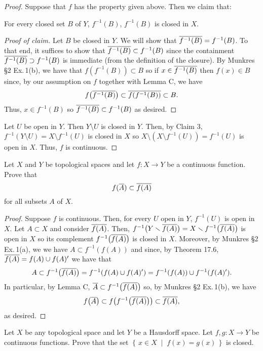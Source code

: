 \begin{proof}
Suppose that $f$ has the property given above. Then we claim that:
\begin{claim}
For every closed set $B$ of $Y$, $f^{-1}(B)$, $f^{-1}(B)$ is
closed in $X$.
\end{claim}
\begin{proof}[Proof of claim]
\renewcommand\qedsymbol{$\clubsuit$}
Let $B$ be closed in $Y$. We will show that
$\overline{f^{-1}(B)}=f^{-1}(B)$. To that end, it suffices to show
that $\overline{f^{-1}(B)}\subset f^{-1}(B)$ since the containment
$\overline{f^{-1}(B)}\supset f^{-1}(B)$ is immediate (from the
definition of the closure). By Munkres \S2 Ex.\,1(b), we have
that $f(f^{-1}(B))\subset B$ so if $x\in\overline{f^{-1}(B)}$ then
$f(x)\in B$ since, by our assumption on $f$ together with Lemma
C, we have
\[
f\bigl(\overline{f^{-1}(B)}\bigr)\subset\overline{f(f^{-1}(B))}\subset B.
\]
Thus, $x\in f^{-1}(B)$ so $\overline{f^{-1}(B)}\subset f^{-1}(B)$ as
desired.
\end{proof}
Let $U$ be open in $Y$. Then $Y\setminus U$ is closed in
$Y$. Then, by Claim 3, $f^{-1}(Y\setminus U)=X\setminus
f^{-1}(U)$ is closed in $X$ so $X\setminus (X\setminus
f^{-1}(U))=f^{-1}(U)$ is open in $X$. Thus, $f$ is continuous.
\end{proof}
\begin{problem}
Let $X$ and $Y$ be topological spaces and let $f\colon X\to Y$ be
a continuous function. Prove that
\[
f(\overline{A})\subset\overline{f(A)}
\]
for all subsets $A$ of $X$.
\end{problem}
\begin{proof}
Suppose $f$ is continuous. Then, for every $U$ open in $Y$,
$f^{-1}(U)$ is open in $X$. Let $A\subset X$ and consider
$\overline{f(A)}$. Then, $f^{-1}\bigl(Y\smallsetminus\overline{f(A)}\bigr)=X\smallsetminus
f^{-1}\bigl(\overline{f(A)}\bigr)$ is open in $X$ so its complement
$f^{-1}\bigl(\overline{f(A)}\bigr)$ is closed in $X$. Moreover, by
Munkres \S2 Ex.\,1(a), we we have $A\subset f^{-1}(f(A))$ and
since, by Theorem 17.6, $\overline{f(A)}=f(A)\cup f(A)'$ we have that
\[
A\subset f^{-1}\bigl(\overline{f(A)}\bigr)=f^{-1}(f(A)\cup
f(A)')=f^{-1}(f(A))\cup f^{-1}(f(A)').
\]
In particular, by Lemma C, $\overline{A}\subset
f^{-1}\bigl(\overline{f(A)}\bigr)$ so, by Munkres \S2 Ex.\,1(b), we have
\[
f\bigl(\overline{A}\bigr)\subset
f\bigl(f^{-1}\bigl(\overline{f(A)}\bigr)\bigr)
\subset
\overline{f(A)},
\]
as desired.
\end{proof}
\begin{problem}
Let $X$ be any topological space and let $Y$ be a Hausdorff
space. Let $f,g\colon X\to Y$ be continuous functions. Prove that
the set $\left\{\,x\in X\;\middle|\;f(x)=g(x)\,\right\}$ is
closed.
\end{problem}

